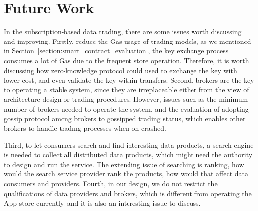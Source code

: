 \documentclass[conference]{IEEEtran}
\begin{document}
\section{Future Work}
\label{section:future_work}
In the subscription-based data trading, there are some issues worth discussing and improving. Firstly, reduce the Gas usage of trading models, as we mentioned in Section~\ref{section:smart_contract_evaluation}, the key exchange process consumes a lot of Gas due to the frequent store operation. Therefore, it is worth discussing how zero-knowledge protocol could used to exchange the key with lower cost, and even validate the key within transfers. Second, brokers are the key to operating a stable system, since they are irreplaceable either from the view of architecture design or trading procedures. However, issues such as the minimum number of brokers needed to operate the system, and the evaluation of adopting gossip protocol among brokers to gossipped trading status, which enables other brokers to handle trading processes when on crashed.

Third, to let consumers search and find interesting data products, a search engine is needed to collect all distributed data products, which might need the authority to design and run the service. The extending issue of searching is ranking, how would the search service provider rank the products, how would that affect data consumers and providers. Fourth, in our design, we do not restrict the qualifications of data providers and brokers, which is different from operating the App store currently, and it is also an interesting issue to discuss.




\end{document}
